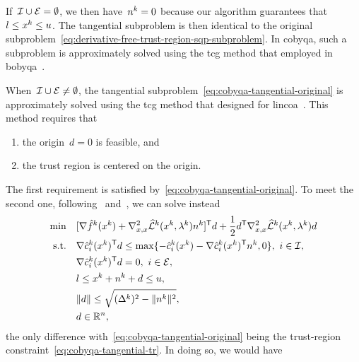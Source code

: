 If~$\mathcal{I} \cup \mathcal{E} = \emptyset$, we then have~$\nstep[k] = 0$ because our algorithm guarantees that~$\xl \le \iter[k] \le \xu$.
The tangential subproblem is then identical to the original subproblem~\cref{eq:derivative-free-trust-region-sqp-subproblem}.
In \gls{cobyqa}, such a subproblem is approximately solved using the \gls{tcg} method that \citeauthor{Powell_2009} employed in \gls{bobyqa}~\cite{Powell_2009}.

When~$\mathcal{I} \cup \mathcal{E} \neq \emptyset$, the tangential subproblem~\cref{eq:cobyqa-tangential-original} is approximately solved using the \gls{tcg} method that \citeauthor{Powell_2015} designed for \gls{lincoa}~\cite{Powell_2015}.
This method requires that
\begin{enumerate}
    \item the origin~$d = 0$ is feasible, and
    \item the trust region is centered on the origin.
\end{enumerate}
The first requirement is satisfied by~\cref{eq:cobyqa-tangential-original}.
To meet the second one, following~\cite[Eq.~(2.10)]{Lalee_Nocedal_Plantenga_1998} and~\cite[Eq.~(15.4.3)]{Conn_Gould_Toint_2000}, we can solve instead
\begin{subequations}
    \label{eq:cobyqa-tangential}
    \begin{align}
        \min        & \quad [\nabla \objm[k](\iter[k]) + \nabla_{x, x}^2 \lagm[k](\iter[k], \lm[k]) \nstep[k]]^{\T} \step + \frac{1}{2} \step^{\T} \nabla_{x, x}^2 \lagm[k](\iter[k], \lm[k]) \step\\
        \text{s.t.} & \quad \nabla \conm[k]{i}(\iter[k])^{\T} \step \le \max \set{-\conm[k]{i}(\iter[k]) - \nabla \conm[k]{i}(\iter[k])^{\T} \nstep[k], 0}, ~ i \in \iub, \label{eq:cobyqa-tangential-ub}\\
                    & \quad \nabla \conm[k]{i}(\iter[k])^{\T} \step = 0, ~ i \in \ieq, \label{eq:cobyqa-tangential-eq}\\
                    & \quad \xl \le \iter[k] + \nstep[k] + \step \le \xu,\\
                    & \quad \norm{\step} \le \sqrt{(\rad[k])^2 - \norm{\nstep[k]}^2}, \label{eq:cobyqa-tangential-tr}\\
                    & \quad \step \in \R^n, \nonumber
    \end{align}
\end{subequations}
the only difference with~\cref{eq:cobyqa-tangential-original} being the trust-region constraint~\cref{eq:cobyqa-tangential-tr}.
In doing so, we would have
